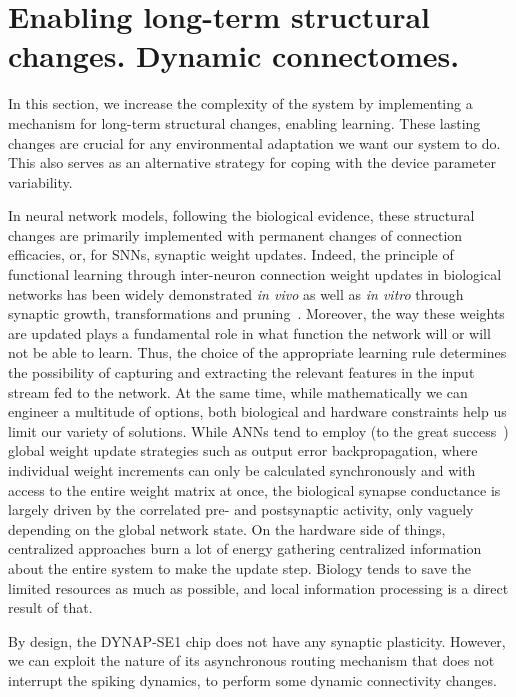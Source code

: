 \chapter{Enabling long-term structural changes. Dynamic connectomes.}
\label{ch:dynamic_connectome}

In this section, we increase the complexity of the system by implementing a mechanism for long-term structural changes, enabling learning. These lasting changes are crucial for any environmental adaptation we want our system to do. This also serves as an alternative strategy for coping with the device parameter variability.

In neural network models, following the biological evidence, these structural changes are primarily implemented with permanent changes of connection efficacies, or, for \ac{SNN}s, synaptic weight updates. Indeed, the principle of functional learning through inter-neuron connection weight updates in biological networks has been widely demonstrated \emph{in vivo} as well as \emph{in vitro} through synaptic growth, transformations and pruning~\cite{George18}.
Moreover, the way these weights are updated plays a fundamental role in what function the network will or will not be able to learn. Thus, the choice of the appropriate learning rule determines the possibility of capturing and extracting the relevant features in the input stream fed to the network. At the same time, while mathematically we can engineer a multitude of options, both biological and hardware constraints help us limit our variety of solutions. While ANNs tend to employ (to the great success~\cite{Sejnowski20}) global weight update strategies such as output error backpropagation, where individual weight increments can only be calculated synchronously and with access to the entire weight matrix at once, the biological synapse conductance is largely driven by the correlated pre- and postsynaptic activity, only vaguely depending on the global network state. On the hardware side of things, centralized approaches burn a lot of energy gathering centralized information about the entire system to make the update step. Biology tends to save the limited resources as much as possible, and local information processing is a direct result of that.

By design, the DYNAP-SE1 chip does not have any synaptic plasticity. However, we can exploit the nature of its asynchronous routing mechanism that does not interrupt the spiking dynamics, to perform some dynamic connectivity changes.

